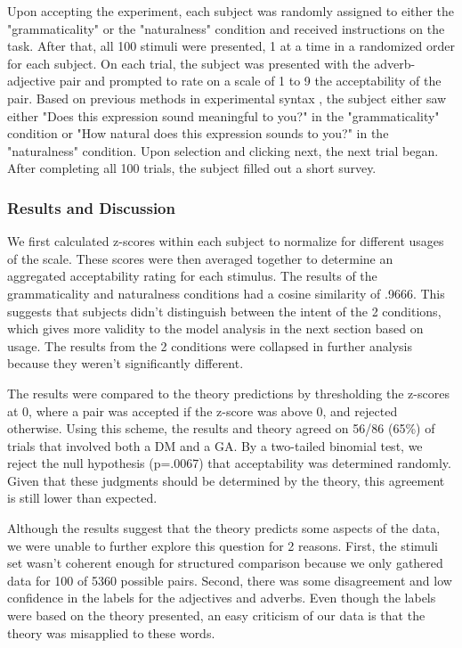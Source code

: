 \documentclass[11pt]{article}
\begin{document}
Upon accepting the experiment, each subject was randomly assigned to either the "grammaticality" or the "naturalness" condition and received instructions on the task. After that, all 100 stimuli were presented, 1 at a time in a randomized order for each subject. On each trial, the subject was presented with the adverb-adjective pair and prompted to rate on a scale of 1 to 9 the acceptability of the pair. Based on previous methods in experimental syntax \cite{sprouse}, the subject either saw either "Does this expression sound meaningful to you?" in the "grammaticality" condition or "How natural does this expression sounds to you?" in the "naturalness" condition. Upon selection and clicking next, the next trial began. After completing all 100 trials, the subject filled out a short survey.

\subsubsection{Results and Discussion}

We first calculated z-scores within each subject to normalize for different usages of the scale. These scores were then averaged together to determine an aggregated acceptability rating for each stimulus. The results of the grammaticality and naturalness conditions had a cosine similarity of .9666. This suggests that subjects didn't distinguish between the intent of the 2 conditions, which gives more validity to the model analysis in the next section based on usage. The results from the 2 conditions were collapsed in further analysis because they weren't significantly different.

The results were compared to the theory predictions by thresholding the z-scores at 0, where a pair was accepted if the z-score was above 0, and rejected otherwise. Using this scheme, the results and theory agreed on 56/86 (65\%) of trials that involved both a DM and a GA. By a two-tailed binomial test, we reject the null hypothesis (p=.0067) that acceptability was determined randomly. Given that these judgments should be determined by the theory, this agreement is still lower than expected.

Although the results suggest that the theory predicts some aspects of the data, we were unable to further explore this question for 2 reasons. First, the stimuli set wasn't coherent enough for structured comparison because we only gathered data for 100 of 5360 possible pairs. Second, there was some disagreement and low confidence in the labels for the adjectives and adverbs. Even though the labels were based on the theory presented, an easy criticism of our data is that the theory was misapplied to these words.
\end{document}
